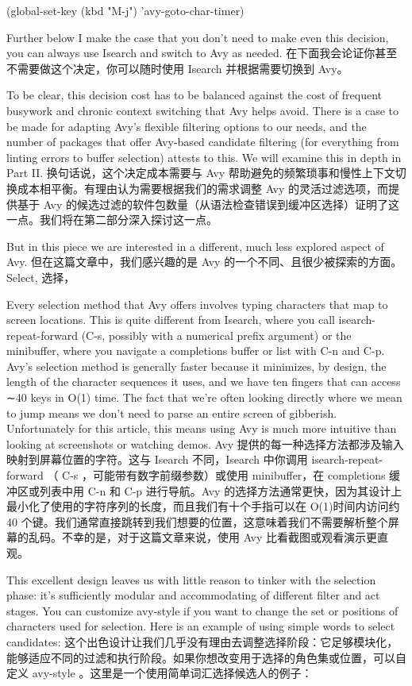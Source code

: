 \documentclass[lang=cn,color=blue]{elegantbook}
\begin{document}
(global-set-key (kbd "M-j") 'avy-goto-char-timer)

Further below I make the case that you don’t need to make even this decision, you can always use Isearch and switch to Avy as needed.
在下面我会论证你甚至不需要做这个决定，你可以随时使用 Isearch 并根据需要切换到 Avy。

To be clear, this decision cost has to be balanced against the cost of frequent busywork and chronic context switching that Avy helps avoid. There is a case to be made for adapting Avy’s flexible filtering options to our needs, and the number of packages that offer Avy-based candidate filtering (for everything from linting errors to buffer selection) attests to this. We will examine this in depth in Part II.
换句话说，这个决定成本需要与 Avy 帮助避免的频繁琐事和慢性上下文切换成本相平衡。有理由认为需要根据我们的需求调整 Avy 的灵活过滤选项，而提供基于 Avy 的候选过滤的软件包数量（从语法检查错误到缓冲区选择）证明了这一点。我们将在第二部分深入探讨这一点。

But in this piece we are interested in a different, much less explored aspect of Avy.
但在这篇文章中，我们感兴趣的是 Avy 的一个不同、且很少被探索的方面。
Select,  选择，

Every selection method that Avy offers involves typing characters that map to screen locations. This is quite different from Isearch, where you call isearch-repeat-forward (C-s, possibly with a numerical prefix argument) or the minibuffer, where you navigate a completions buffer or list with C-n and C-p. Avy’s selection method is generally faster because it minimizes, by design, the length of the character sequences it uses, and we have ten fingers that can access ∼40 keys in O(1) time. The fact that we’re often looking directly where we mean to jump means we don’t need to parse an entire screen of gibberish. Unfortunately for this article, this means using Avy is much more intuitive than looking at screenshots or watching demos.
Avy 提供的每一种选择方法都涉及输入映射到屏幕位置的字符。这与 Isearch 不同，Isearch 中你调用 isearch-repeat-forward （ C-s ，可能带有数字前缀参数）或使用 minibuffer，在 completions 缓冲区或列表中用 C-n 和 C-p 进行导航。Avy 的选择方法通常更快，因为其设计上最小化了使用的字符序列的长度，而且我们有十个手指可以在 O(1)时间内访问约 40 个键。我们通常直接跳转到我们想要的位置，这意味着我们不需要解析整个屏幕的乱码。不幸的是，对于这篇文章来说，使用 Avy 比看截图或观看演示更直观。

This excellent design leaves us with little reason to tinker with the selection phase: it’s sufficiently modular and accommodating of different filter and act stages. You can customize avy-style if you want to change the set or positions of characters used for selection. Here is an example of using simple words to select candidates:
这个出色设计让我们几乎没有理由去调整选择阶段：它足够模块化，能够适应不同的过滤和执行阶段。如果你想改变用于选择的角色集或位置，可以自定义 avy-style 。这里是一个使用简单词汇选择候选人的例子：
\end{document}
